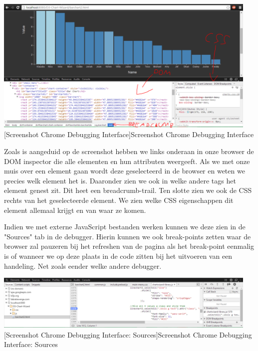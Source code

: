 \begin{center}
  \includegraphics[width=0.95\textwidth]{figures/chap2/chromedebugger.png}
  [Screenshot Chrome Debugging Interface]{Screenshot Chrome Debugging Interface
  \label{fig_sourcetree}}
\end{center}

Zoals is aangeduid op de screenshot hebben we links onderaan in onze browser de DOM inspector die alle elementen en hun attributen weergeeft. Als we met onze muis over een element gaan wordt deze geselecteerd in de browser en weten we precies welk element het is. Daaronder zien we ook in welke andere tags het element genest zit. Dit heet een breadcrumb-trail. Ten slotte zien we ook de CSS rechts van het geselecteerde element. We zien welke CSS eigenschappen dit element allemaal krijgt en van waar ze komen.

Indien we met externe JavaScript bestanden werken kunnen we deze zien in de "Sources" tab in de debugger. Hierin kunnen we ook break-points zetten waar de browser zal pauzeren bij het refreshen van de pagina als het break-point eenmalig is of wanneer we op deze plaats in de code zitten bij het uitvoeren van een handeling. Net zoals eender welke andere debugger.

\begin{center}
  \includegraphics[width=0.95\textwidth]{figures/chap2/sourcestab.png}
  [Screenshot Chrome Debugging Interface: Sources]{Screenshot Chrome Debugging Interface: Sources
\label{fig_sourcetree}}
\end{center} 

